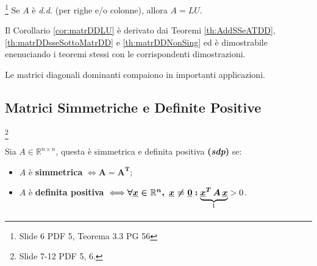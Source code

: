\addtocounter{footnote}{-1}


\begin{corollary}\label{cor:matrDDLU}\footnote{Slide 6 PDF 5, Teorema 3.3 PG 56}
    Se $A$ è \textit{d.d.} (per righe e/o colonne), allora $A=LU$.
\end{corollary}

Il Corollario \ref{cor:matrDDLU} è derivato dai Teoremi \ref{th:AddSSeATDD}, \ref{th:matrDDsseSottoMatrDD} e \ref{th:matrDDNonSing} ed è dimostrabile enenuciando i teoremi stessi con le corrispondenti dimostrazioni.

\begin{remark}
    Le matrici diagonali dominanti compaiono in importanti applicazioni.
\end{remark}

\subsection{Matrici Simmetriche e Definite Positive}\label{ssec:matrSDPFattLDL}\footnote{Slide 7-12 PDF 5, 6.}
\begin{definition}
    Sia $A\in\mathbb R^{n\times n}$, questa è simmetrica e definita positiva \textbf{(\textit{sdp})} se:
    \begin{itemize}
        \item $A$ è \textbf{simmetrica} $\iff \boldsymbol{A=A^T}$;
        \item $A$ è \textbf{definita positiva} $\iff\boldsymbol{\forall\uline x\in\mathbb R^n,\; \uline x\neq \uline 0:} \underbrace{\boldsymbol{\uline x^T\, A\, \uline x}}_{\footnotemark}>0$.
    \end{itemize}
\end{definition}


